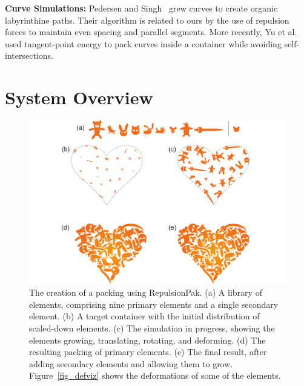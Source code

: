 \newtext
{
\textbf{Curve Simulations:} Pedersen and
Singh~\cite{Pedersen2006} grew curves to create organic
labyrinthine paths. Their algorithm is related to ours by the use
of repulsion forces to maintain even spacing and parallel segments.
More recently, Yu et al.~\cite{Yu2020} used tangent-point energy
to pack curves inside a container while avoiding self-intersections.
}

\section{System Overview}
\label{repulsionpak_system_overview}




\begin{figure}[t]
\vspace{-30pt}
\centering
\includegraphics[width=1.0\textwidth]{figures/repulsionpak/pipeline.pdf} 
\caption[RepulsionPak pipeline]
{\label{fig_repulsionpak_pipeline} 
The creation of a packing using RepulsionPak.
  (a) A library of elements, comprising nine primary elements and a single
  	secondary element.
  (b) A target container with the initial distribution of scaled-down elements.
  (c) The simulation in progress, showing the elements growing, translating,
  	rotating, and deforming.
  (d) The resulting packing of primary elements.
  (e) The final result, after adding secondary elements and allowing them to
  	grow.
  	Figure~\ref{fig_defviz} shows the deformations of some of the elements. }
\end{figure}

